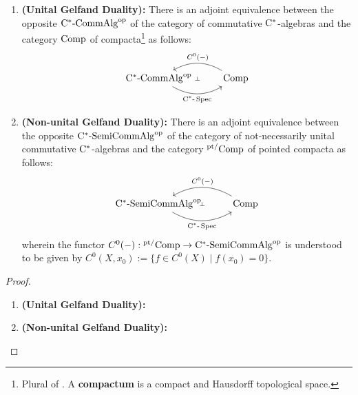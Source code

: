         \begin{theorem} \label{theorem: gelfand_duality}
            \noindent
            \begin{enumerate}
                \item \textbf{(Unital Gelfand Duality):} There is an adjoint equivalence between the opposite $\mathrm{C}^*\text{-}\mathrm{Comm}\mathrm{Alg}^{\mathrm{op}}$ of the category of commutative $\mathrm{C}^*$-algebras and the category $\mathrm{Comp}$ of compacta\footnote{Plural of . A \textbf{compactum} is a compact and Hausdorff topological space.} as follows:
                    $$
                        \begin{tikzcd}
                            {\rmC^*\-\Comm\Alg^{\op}} & \Comp
                            \arrow[""{name=0, anchor=center, inner sep=0}, "{\rmC^*\-\Spec}"', bend right, from=1-1, to=1-2]
                            \arrow[""{name=1, anchor=center, inner sep=0}, "{C^0(-)}"', bend right, from=1-2, to=1-1]
                            \arrow["\dashv"{anchor=center, rotate=-90}, draw=none, from=1, to=0]
                        \end{tikzcd}
                    $$
                \item \textbf{(Non-unital Gelfand Duality):} There is an adjoint equivalence between the opposite $\mathrm{C}^*\text{-}\mathrm{Semi}\mathrm{Comm}\mathrm{Alg}^{\mathrm{op}}$ of the category of not-necessarily unital commutative $\mathrm{C}^*$-algebras and the category ${}^{\mathrm{pt}/}\mathrm{Comp}$ of pointed compacta as follows:
                    $$
                        \begin{tikzcd}
                            {\rmC^*\-\Semi\Comm\Alg^{\op}} & { \Comp}
                            \arrow[""{name=0, anchor=center, inner sep=0}, "{\rmC^*\-\Spec}"', bend right, from=1-1, to=1-2]
                            \arrow[""{name=1, anchor=center, inner sep=0}, "{C^0(-)}"', bend right, from=1-2, to=1-1]
                            \arrow["\dashv"{anchor=center, rotate=-90}, draw=none, from=1, to=0]
                        \end{tikzcd}
                    $$
                wherein the functor $C^0(-): {}^{\mathrm{pt}/}\mathrm{Comp} \to \mathrm{C}^*\text{-}\mathrm{Semi}\mathrm{Comm}\mathrm{Alg}^{\mathrm{op}}$ is understood to be given by $C^0(X, x_0) := \{f \in C^0(X) \mid f(x_0) = 0\}$.
            \end{enumerate}
        \end{theorem}
            \begin{proof}
                \noindent
                \begin{enumerate}
                    \item \textbf{(Unital Gelfand Duality):} 
                    \item \textbf{(Non-unital Gelfand Duality):} 
                \end{enumerate}
            \end{proof}
        
